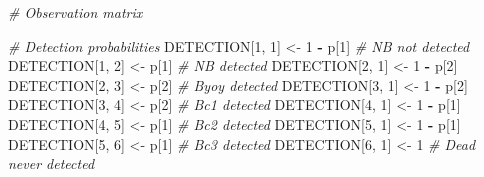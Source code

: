 \documentclass[
  12pt,
]{krantz}
\newenvironment{Shaded}{\begin{snugshade}}{\end{snugshade}}
\newcommand{\CommentTok}[1]{\textcolor[rgb]{0.56,0.35,0.01}{\textit{#1}}}
\newcommand{\DecValTok}[1]{\textcolor[rgb]{0.00,0.00,0.81}{#1}}
\newcommand{\NormalTok}[1]{#1}
\newcommand{\OtherTok}[1]{\textcolor[rgb]{0.56,0.35,0.01}{#1}}
\newcommand{\SpecialCharTok}[1]{\textcolor[rgb]{0.81,0.36,0.00}{\textbf{#1}}}
\begin{document}
\begin{Shaded}
\begin{Highlighting}[]
\CommentTok{\# Observation matrix}

\CommentTok{\# Detection probabilities}
\NormalTok{DETECTION[}\DecValTok{1}\NormalTok{, }\DecValTok{1}\NormalTok{] }\OtherTok{\textless{}{-}} \DecValTok{1} \SpecialCharTok{{-}}\NormalTok{ p[}\DecValTok{1}\NormalTok{]     }\CommentTok{\# NB not detected}
\NormalTok{DETECTION[}\DecValTok{1}\NormalTok{, }\DecValTok{2}\NormalTok{] }\OtherTok{\textless{}{-}}\NormalTok{ p[}\DecValTok{1}\NormalTok{]         }\CommentTok{\# NB detected}
\NormalTok{DETECTION[}\DecValTok{2}\NormalTok{, }\DecValTok{1}\NormalTok{] }\OtherTok{\textless{}{-}} \DecValTok{1} \SpecialCharTok{{-}}\NormalTok{ p[}\DecValTok{2}\NormalTok{]}
\NormalTok{DETECTION[}\DecValTok{2}\NormalTok{, }\DecValTok{3}\NormalTok{] }\OtherTok{\textless{}{-}}\NormalTok{ p[}\DecValTok{2}\NormalTok{]        }\CommentTok{\# Byoy detected}
\NormalTok{DETECTION[}\DecValTok{3}\NormalTok{, }\DecValTok{1}\NormalTok{] }\OtherTok{\textless{}{-}} \DecValTok{1} \SpecialCharTok{{-}}\NormalTok{ p[}\DecValTok{2}\NormalTok{]}
\NormalTok{DETECTION[}\DecValTok{3}\NormalTok{, }\DecValTok{4}\NormalTok{] }\OtherTok{\textless{}{-}}\NormalTok{ p[}\DecValTok{2}\NormalTok{]         }\CommentTok{\# Bc1 detected}
\NormalTok{DETECTION[}\DecValTok{4}\NormalTok{, }\DecValTok{1}\NormalTok{] }\OtherTok{\textless{}{-}} \DecValTok{1} \SpecialCharTok{{-}}\NormalTok{ p[}\DecValTok{1}\NormalTok{]}
\NormalTok{DETECTION[}\DecValTok{4}\NormalTok{, }\DecValTok{5}\NormalTok{] }\OtherTok{\textless{}{-}}\NormalTok{ p[}\DecValTok{1}\NormalTok{]         }\CommentTok{\# Bc2 detected}
\NormalTok{DETECTION[}\DecValTok{5}\NormalTok{, }\DecValTok{1}\NormalTok{] }\OtherTok{\textless{}{-}} \DecValTok{1} \SpecialCharTok{{-}}\NormalTok{ p[}\DecValTok{1}\NormalTok{]}
\NormalTok{DETECTION[}\DecValTok{5}\NormalTok{, }\DecValTok{6}\NormalTok{] }\OtherTok{\textless{}{-}}\NormalTok{ p[}\DecValTok{1}\NormalTok{]         }\CommentTok{\# Bc3 detected}
\NormalTok{DETECTION[}\DecValTok{6}\NormalTok{, }\DecValTok{1}\NormalTok{] }\OtherTok{\textless{}{-}} \DecValTok{1}           \CommentTok{\# Dead never detected}


\end{Highlighting}
\end{Shaded}
\end{document}
